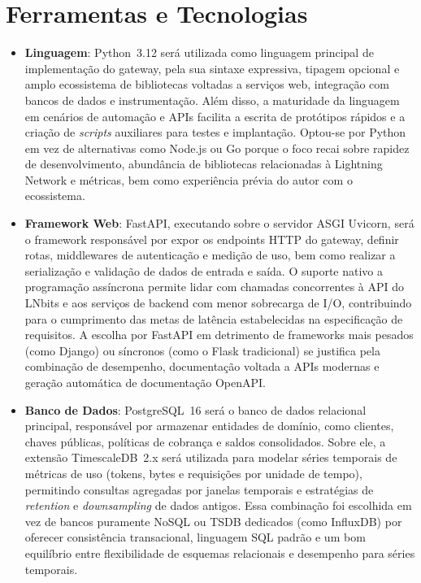 \documentclass[openright]{normas-utf-tex}
\begin{document}
\section{Ferramentas e Tecnologias}
\begin{itemize}
    \item \textbf{Linguagem}: Python~3.12 será utilizada como linguagem principal de implementação do gateway, pela sua sintaxe expressiva, tipagem opcional e amplo ecossistema de bibliotecas voltadas a serviços web, integração com bancos de dados e instrumentação. Além disso, a maturidade da linguagem em cenários de automação e APIs facilita a escrita de protótipos rápidos e a criação de \textit{scripts} auxiliares para testes e implantação. Optou-se por Python em vez de alternativas como Node.js ou Go porque o foco recai sobre rapidez de desenvolvimento, abundância de bibliotecas relacionadas à Lightning Network e métricas, bem como experiência prévia do autor com o ecossistema.

    \item \textbf{Framework Web}: FastAPI, executando sobre o servidor ASGI Uvicorn, será o framework responsável por expor os endpoints HTTP do gateway, definir rotas, middlewares de autenticação e medição de uso, bem como realizar a serialização e validação de dados de entrada e saída. O suporte nativo a programação assíncrona permite lidar com chamadas concorrentes à API do LNbits e aos serviços de backend com menor sobrecarga de I/O, contribuindo para o cumprimento das metas de latência estabelecidas na especificação de requisitos. A escolha por FastAPI em detrimento de frameworks mais pesados (como Django) ou síncronos (como o Flask tradicional) se justifica pela combinação de desempenho, documentação voltada a APIs modernas e geração automática de documentação OpenAPI.

    \item \textbf{Banco de Dados}: PostgreSQL~16 será o banco de dados relacional principal, responsável por armazenar entidades de domínio, como clientes, chaves públicas, políticas de cobrança e saldos consolidados. Sobre ele, a extensão TimescaleDB~2.x será utilizada para modelar séries temporais de métricas de uso (tokens, bytes e requisições por unidade de tempo), permitindo consultas agregadas por janelas temporais e estratégias de \textit{retention} e \textit{downsampling} de dados antigos. Essa combinação foi escolhida em vez de bancos puramente NoSQL ou TSDB dedicados (como InfluxDB) por oferecer consistência transacional, linguagem SQL padrão e um bom equilíbrio entre flexibilidade de esquemas relacionais e desempenho para séries temporais.


\end{itemize}
\end{document}
